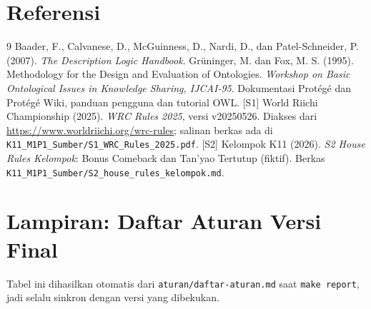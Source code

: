 \documentclass[11pt,a4paper]{article}
\begin{document}
\section*{Referensi}

\begin{thebibliography}{9}
 Baader, F., Calvanese, D., McGuinness, D., Nardi, D., dan
  Patel-Schneider, P. (2007). \emph{The Description Logic Handbook}.
 Grüninger, M. dan Fox, M. S. (1995). Methodology for the Design
  and Evaluation of Ontologies. \emph{Workshop on Basic Ontological Issues in
  Knowledge Sharing, IJCAI-95}.
 Dokumentasi Protégé dan Protégé Wiki, panduan pengguna dan
  tutorial OWL.
 [S1] World Riichi Championship (2025). \emph{WRC Rules 2025}, versi
  v20250526. Diakses dari \url{https://www.worldriichi.org/wrc-rules}; salinan berkas
  ada di \texttt{K11\_M1P1\_Sumber/S1\_WRC\_Rules\_2025.pdf}.
 [S2] Kelompok K11 (2026). \emph{S2 House Rules Kelompok}: Bonus
  Comeback dan Tan'yao Tertutup (fiktif). Berkas
  \texttt{K11\_M1P1\_Sumber/S2\_house\_rules\_kelompok.md}.
\end{thebibliography}

\clearpage
\appendix
\section{Lampiran: Daftar Aturan Versi Final}
\label{sec:lampiran}

Tabel ini dihasilkan otomatis dari \texttt{aturan/daftar-aturan.md} saat
\texttt{make report}, jadi selalu sinkron dengan versi yang dibekukan.


\end{document}
